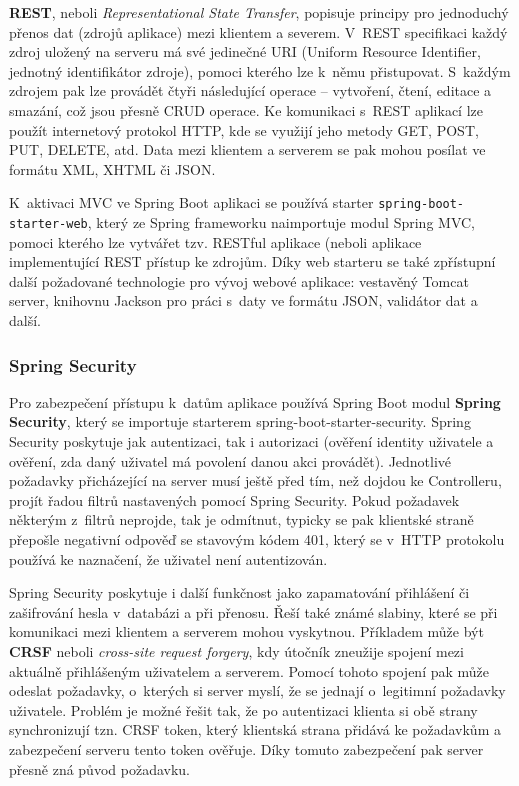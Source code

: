 \textbf{REST}, neboli \textit{Representational State Transfer}, popisuje principy pro jednoduchý přenos dat (zdrojů aplikace) mezi klientem a severem. V~REST specifikaci každý zdroj uložený na serveru má své jedinečné URI (Uniform Resource Identifier, jednotný identifikátor zdroje), pomoci kterého lze k~němu přistupovat. S~každým zdrojem pak lze provádět čtyři následující operace – vytvoření, čtení, editace a smazání, což jsou přesně CRUD operace. Ke komunikaci s~REST aplikací lze použít internetový protokol HTTP, kde se využijí jeho metody GET, POST, PUT, DELETE, atd. Data mezi klientem a serverem se pak mohou posílat ve formátu XML, XHTML či JSON.

K~aktivaci MVC ve Spring Boot aplikaci se používá starter \texttt{spring-boot-starter-web}, který ze Spring frameworku naimportuje modul Spring MVC, pomoci kterého lze vytvářet tzv. RESTful aplikace (neboli aplikace implementující REST přístup ke zdrojům. Díky web starteru se také zpřístupní další požadované technologie pro vývoj webové aplikace:  vestavěný Tomcat server, knihovnu Jackson pro práci s~daty ve formátu JSON,  validátor dat a další.

\subsubsection* {Spring Security}

Pro zabezpečení přístupu k~datům aplikace používá Spring Boot modul \textbf{Spring Security}, který se importuje starterem \texttt{}{spring-boot-starter-security}. Spring Security poskytuje jak autentizaci, tak i autorizaci (ověření identity uživatele a ověření, zda daný uživatel má povolení danou akci provádět). Jednotlivé požadavky přicházející na server musí ještě před tím, než dojdou ke Controlleru, projít řadou filtrů nastavených pomocí Spring Security. Pokud požadavek některým z~filtrů neprojde, tak je odmítnut, typicky se pak klientské straně přepošle negativní odpověď se stavovým kódem 401, který se v~HTTP protokolu používá ke naznačení, že uživatel není autentizován. 

Spring Security poskytuje i další funkčnost jako zapamatování přihlášení či zašifrování hesla v~databázi a při přenosu. Řeší také známé slabiny, které se při komunikaci mezi klientem a serverem mohou vyskytnou. Příkladem může být \textbf{CRSF} neboli \textit{cross-site request forgery}, kdy útočník zneužije spojení mezi aktuálně přihlášeným uživatelem a serverem. Pomocí tohoto spojení pak může odeslat požadavky, o~kterých si server myslí, že se jednají o~legitimní požadavky uživatele. Problém je možné řešit tak, že po autentizaci klienta si obě strany synchronizují tzn. CRSF token, který klientská strana přidává ke požadavkům a zabezpečení serveru tento token ověřuje. Díky tomuto zabezpečení pak server přesně zná původ požadavku.  


